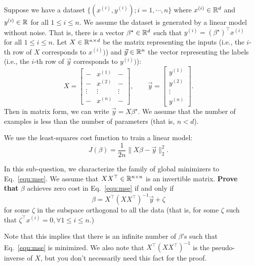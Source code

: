 \item {}  Suppose we have a dataset $\{(x^{(i)}, y^{(i)});i=1,\cdots,n\}$ where $x^{(i)}\in \mathbb{R}^{d}$ and $y^{(i)}\in \mathbb{R}$ for all $1\le i\le n.$ We assume the dataset is generated by a linear model without noise. That is, there is a vector $\beta^\star\in\mathbb{R}^{d}$ such that $y^{(i)}=(\beta^\star)^\top x^{(i)}$ for all $1\le i\le n$. Let $X\in \mathbb{R}^{n\times d}$ be the matrix representing the inputs (i.e., the $i$-th row of $X$ corresponds to $x^{(i)})$) and $\vec{y}\in\mathbb{R}^{n}$ the vector representing the labels (i.e., the $i$-th row of $\vec{y}$ corresponds to $y^{(i)})$):
$$
	X=
\begin{bmatrix}
	- & x^{(1)} & - \\
	- & x^{(2)} & - \\
	\vdots & \vdots & \vdots\\
	- & x^{(n)} & - 
\end{bmatrix},\qquad
\vec{y}=
\begin{bmatrix}
y^{(1)} \\
y^{(2)}\\
\vdots\\
y^{(n)}
\end{bmatrix}.
$$
Then in matrix form, we can write $\vec{y}=X\beta^\star.$
We assume that the number of examples is less than the number of parameters (that is, $n<d$).

We use the least-squares cost function to train a linear model:
\begin{equation}\label{equ:mse}
	J(\beta)=\frac{1}{2n}\|X\beta-\vec{y}\|_2^2.
\end{equation}

In this sub-question, we characterize the family of global minimizers to Eq.~\eqref{equ:mse}. We assume that $X X^\top\in \mathbb{R}^{n\times n}$ is an invertible matrix. \textbf{Prove that} $\beta$ achieves zero cost in Eq.~\eqref{equ:mse} if and only if 
\begin{equation}\label{equ:ir2}
	\beta=X^\top (XX^\top)^{-1}\vec{y}+\zeta
\end{equation} for some $\zeta$ in the subspace orthogonal to all the data (that is, for some $\zeta$ such that $\zeta^\top x^{(i)}=0,\forall 1\le i\le n.$) 

Note that this implies that there is an infinite number of $\beta$'s such that Eq.~\eqref{equ:mse} is minimized. We also note that $X^\top (XX^\top)^{-1}$ is the pseudo-inverse of $X$, but you don't necessarily need this fact for the proof.

